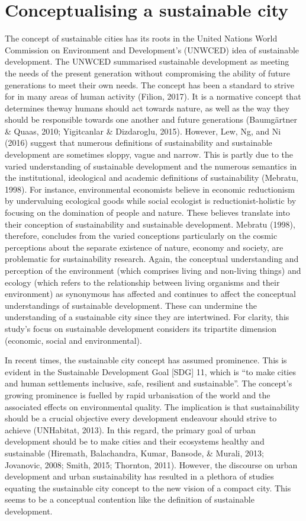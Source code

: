 \section{Conceptualising a sustainable city}

The concept of sustainable cities has its roots in the United Nations World Commission on Environment and Development's (UNWCED) idea of sustainable development. The UNWCED summarised sustainable development as meeting the needs of the present generation without compromising the ability of future generations to meet their own needs. The concept has been a standard to strive for in many areas of human activity (Filion, 2017). It is a normative concept that determines theway humans should act towards nature, as well as the way they should be responsible towards one another and future generations (Baumgärtner & Quaas, 2010; Yigitcanlar & Dizdaroglu, 2015). However, Lew, Ng, and Ni (2016) suggest that numerous definitions of sustainability and sustainable development are sometimes sloppy, vague and narrow. This is partly due to the varied understanding of sustainable development and the numerous semantics in the institutional, ideological and academic definitions of sustainability (Mebratu, 1998). For instance, environmental economists believe in economic reductionism by undervaluing ecological goods while social ecologist is reductionist-holistic by focusing on the domination of people and nature. These believes translate into their conception of sustainability and sustainable development. Mebratu (1998), therefore, concludes from the varied conceptions particularly on the cosmic perceptions about the separate existence of nature, economy and society, are problematic for sustainability research. Again, the conceptual understanding and perception of the environment (which comprises living and non-living things) and ecology (which refers to the relationship between living organisms and their environment) as synonymous has affected and continues to affect the conceptual understandings of sustainable development. These can undermine the understanding of a sustainable city since they are intertwined. For clarity, this study's focus on sustainable development considers its tripartite dimension (economic, social and environmental).

In recent times, the sustainable city concept has assumed prominence. This is evident in the Sustainable Development Goal [SDG] 11, which is “to make cities and human settlements inclusive, safe, resilient and sustainable”. The concept's growing prominence is fuelled by rapid urbanisation of the world and the associated effects on environmental quality. The implication is that sustainability should be a crucial objective every development endeavour should strive to achieve (UNHabitat, 2013). In this regard, the primary goal of urban development should be to make cities and their ecosystems healthy and sustainable (Hiremath, Balachandra, Kumar, Bansode, & Murali, 2013; Jovanovic, 2008; Smith, 2015; Thornton, 2011). However, the discourse on urban development and urban sustainability has resulted in a plethora of studies equating the sustainable city concept to the new vision of a compact city. This seems to be a conceptual contention like the definition of sustainable development.

